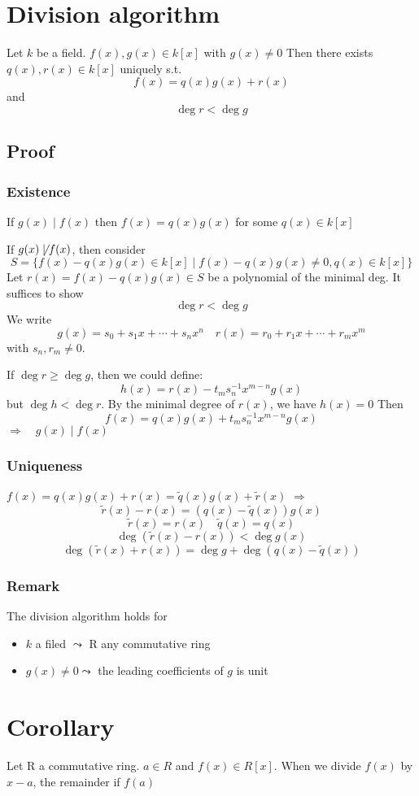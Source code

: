 \documentclass{book}
\begin{document}
\section{Division algorithm}
Let $k$ be a field. $f(x),g(x)\in k[x]$ with $g(x)\neq 0$ Then there exists $q(x),r(x)\in k[x]$ uniquely s.t.
$$f(x)=q(x)g(x)+r(x)$$ and $$\deg r<\deg g$$
\subsection*{Proof}
\subsubsection{Existence} If $g(x)\mid f(x)$ then $f(x)=q(x)g(x)$ for some $q(x)\in k[x]$

If $g(x)\not\mid f(x)$, then consider$$S=\{f(x)-q(x)g(x)\in k[x]\mid f(x)-q(x)g(x)\neq 0,q(x)\in k[x]\}$$
Let $r(x)=f(x)-q(x)g(x)\in S$ be a polynomial of the minimal deg. It suffices to show $$\deg r<\deg g$$
We write $$g(x)=s_0+s_1x+\cdots+s_nx^n\quad r(x)=r_0+r_1x+\cdots+r_mx^m$$with $s_n,r_m\neq 0$. 

If $\deg r\geq\deg g$, then we could define:
$$h(x)=r(x)-t_ms_n^{-1}x^{m-n}g(x)$$but $\deg h<\deg r$. By the minimal degree of $r(x)$, we have $h(x)=0$ Then $$f(x)=q(x)g(x)+t_ms_n^{-1}x^{m-n}g(x)$$$\Rightarrow\quad g(x)\mid f(x)$
\subsubsection{Uniqueness}
$f(x)=q(x)g(x)+r(x)=\tilde q(x)g(x)+\tilde r(x)$ $\Rightarrow$
$$\tilde r(x)-r(x)=(q(x)-\tilde q(x))g(x)$$$$\tilde r(x)=r(x)\quad \tilde q(x)=q(x)$$
$$\deg(\tilde r(x)-r(x))<\deg g(x)$$
$$\deg(\tilde r(x)+r(x))=\deg g+\deg(q(x)-\tilde q(x))$$
\subsubsection{Remark}The division algorithm holds for
\begin{itemize}
	\item $k$ a filed $\leadsto$ R any commutative ring
	\item $g(x)\neq 0$$\leadsto$ the leading coefficients of $g$ is unit
\end{itemize} 
\section{Corollary}
\label{Division Corollary}
Let R a commutative ring. $a\in R$ and $f(x)\in R[x]$. When we divide $f(x)$ by $x-a$, the remainder if $f(a)$
\end{document}
